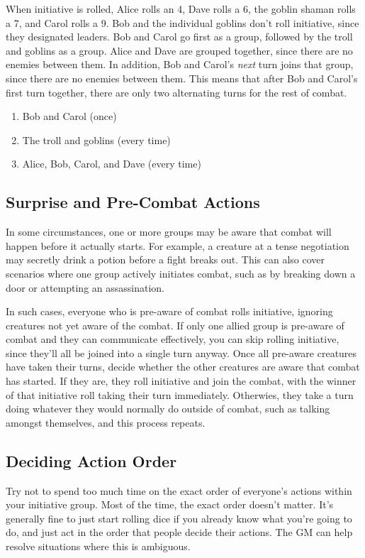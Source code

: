      When initiative is rolled, Alice rolls an 4, Dave rolls a 6, the goblin shaman rolls a 7, and Carol rolls a 9.
      Bob and the individual goblins don't roll initiative, since they designated leaders.
      Bob and Carol go first as a group, followed by the troll and goblins as a group.
      Alice and Dave are grouped together, since there are no enemies between them.
      In addition, Bob and Carol's \textit{next} turn joins that group, since there are no enemies between them.
      This means that after Bob and Carol's first turn together, there are only two alternating turns for the rest of combat.

      \begin{enumerate}
        \item Bob and Carol (once)
        \item The troll and goblins (every time)
        \item Alice, Bob, Carol, and Dave (every time)
      \end{enumerate}

  \subsection{Surprise and Pre-Combat Actions}
    In some circumstances, one or more groups may be aware that combat will happen before it actually starts.
    For example, a creature at a tense negotiation may secretly drink a potion before a fight breaks out.
    This can also cover scenarios where one group actively initiates combat, such as by breaking down a door or attempting an assassination.

    In such cases, everyone who is pre-aware of combat rolls initiative, ignoring creatures not yet aware of the combat.
    If only one allied group is pre-aware of combat and they can communicate effectively, you can skip rolling initiative, since they'll all be joined into a single turn anyway.
    Once all pre-aware creatures have taken their turns, decide whether the other creatures are aware that combat has started.
    If they are, they roll initiative and join the combat, with the winner of that initiative roll taking their turn immediately.
    Otherwies, they take a turn doing whatever they would normally do outside of combat, such as talking amongst themselves, and this process repeats.

  \subsection{Deciding Action Order}\label{Deciding Action Order}
    Try not to spend too much time on the exact order of everyone's actions within your initiative group.
    Most of the time, the exact order doesn't matter.
    It's generally fine to just start rolling dice if you already know what you're going to do, and just act in the order that people decide their actions.
    The GM can help resolve situations where this is ambiguous.

